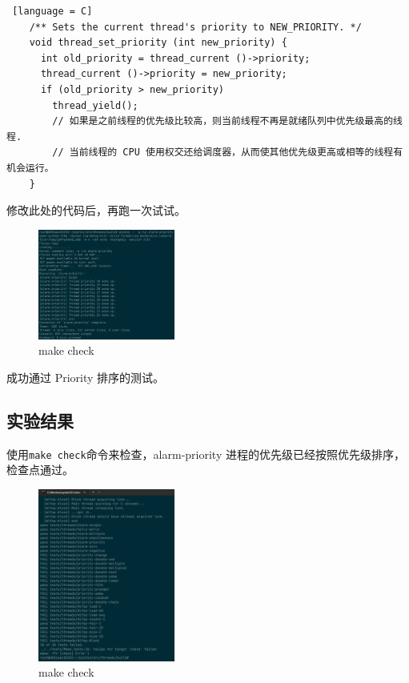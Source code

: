 \begin{lstlisting} [language = C]
    /** Sets the current thread's priority to NEW_PRIORITY. */
    void thread_set_priority (int new_priority) {
      int old_priority = thread_current ()->priority;
      thread_current ()->priority = new_priority;
      if (old_priority > new_priority)
        thread_yield();
        // 如果是之前线程的优先级比较高，则当前线程不再是就绪队列中优先级最高的线程.
        // 当前线程的 CPU 使用权交还给调度器，从而使其他优先级更高或相等的线程有机会运行。
    }
\end{lstlisting}

修改此处的代码后，再跑一次试试。

\begin{figure} [H]
    \centering
    \includegraphics[width=0.4\textwidth]{img3/result.png}
    \caption{make check}
    \label{fig:make_check}
\end{figure}

成功通过 Priority 排序的测试。

\subsection{实验结果}

使用\texttt{make check}命令来检查，alarm-priority 进程的优先级已经按照优先级排序，检查点通过。

\begin{figure} [H]
    \centering
    \includegraphics[width=0.4\textwidth]{img3/makecheck.png}
    \caption{make check}
    \label{fig:make_check2}
\end{figure}

